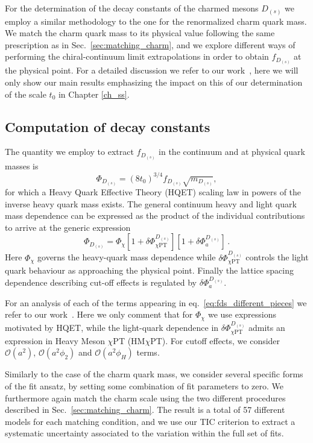 For the determination of the decay constants of the charmed mesons $D_{(s)}$ we employ a similar methodology to the one for the renormalized charm quark mass. We match the charm quark mass to its physical value following the same prescription as in Sec.~\ref{sec:matching_charm}, and we explore different ways of performing the chiral-continuum limit extrapolations in order to obtain $f_{D_{(s)}}$ at the physical point. For a detailed discussion we refer to our work~\citep{charm}, here we will only show our main results emphasizing the impact on this of our determination of the scale $t_0$ in Chapter \ref{ch_ss}.

\subsection{Computation of decay constants}

The quantity we employ to extract $f_{D_{(s)}}$ in the continuum and at physical quark masses is
\begin{equation}
  \Phi_{D_{(s)}} = (8t_0)^{3/4}f_{D_{(s)}} \sqrt{m_{D_{(s)}}},
  \label{eq:defphiD}
\end{equation}
for which a Heavy Quark Effective Theory (HQET) scaling law in powers of the inverse
heavy quark mass exists.
The general continuum heavy and light quark mass dependence can be expressed as the product of the individual contributions to arrive at the generic expression 
\begin{equation}
	\Phi_{D_{(s)}} = \Phi_{\chi} \left[
	1 + \delta\Phi_{\chi\mathrm{PT}}^{D_{(s)}}
	\right]
	\left[
	1 + \delta\Phi_a^{D_{(s)}}
	\right]\,.
	\label{eq:fds_different_pieces}
\end{equation}
Here $\Phi_\chi$ governs the heavy-quark mass dependence while  $\delta\Phi_{\chi\mathrm{PT}}^{D_{(s)}}$ controls the light quark behaviour as approaching the physical point. Finally the lattice spacing dependence describing cut-off effects is regulated by $\delta\Phi_a^{D_{(s)}}$. 

For an analysis of each of the terms appearing in eq.~\ref{eq:fds_different_pieces} we refer to our work~\citep{charm}. Here we only comment that for $\Phi_{\chi}$ we use expressions motivated by HQET, while the light-quark dependence in $\delta\Phi_{\chi\mathrm{PT}}^{D_{(s)}}$ admits an expression in Heavy Meson $\chi$PT (HM$\chi$PT). For cutoff effects, we consider $\mathcal{O}(a^2)$, $\mathcal{O}(a^2\phi_2)$ and $\mathcal{O}(a^2\phi_H)$ terms.

Similarly to the case of the charm quark mass, we consider several specific forms of the fit ansatz,
by setting some combination of fit parameters to zero. We furthermore again match the charm scale using
the two different procedures described in Sec.~\ref{sec:matching_charm}. The result is a total
of 57 different models  for each matching condition,
and we use our TIC criterion to extract a systematic uncertainty associated to the variation
within the full set of fits.

